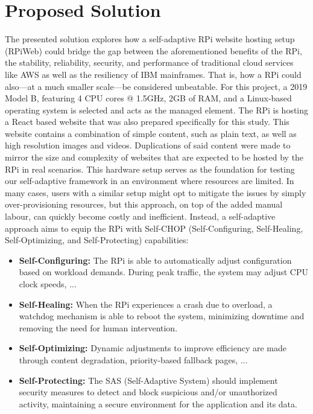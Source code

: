 \documentclass[conference]{IEEEtran}
\begin{document}
\section{\textbf{Proposed Solution}}\label{proposed_solution}
The presented solution explores how a self-adaptive RPi website hosting setup (RPiWeb) could bridge the gap between the aforementioned benefits of the RPi, the stability, reliability, security, and performance of traditional cloud services like AWS as well as the resiliency of IBM mainframes. That is, how a RPi could also—at a much smaller scale—be considered unbeatable. For this project, a 2019 Model B, featuring 4 CPU cores @ 1.5GHz, 2GB of RAM, and a Linux-based operating system is selected and acts as the managed element. The RPi is hosting a React based website that was also prepared specifically for this study. This website contains a combination of simple content, such as plain text, as well as high resolution images and videos. Duplications of said content were made to mirror the size and complexity of websites that are expected to be hosted by the RPi in real scenarios. This hardware setup serves as the foundation for testing our self-adaptive framework in an environment where resources are limited. In many cases, users with a similar setup might opt to mitigate the issues by simply over-provisioning resources, but this approach, on top of the added manual labour, can quickly become costly and inefficient. Instead, a self-adaptive approach aims to equip the RPi with Self-CHOP (Self-Configuring, Self-Healing, Self-Optimizing, and Self-Protecting) capabilities:

\begin{itemize}
    \item \textbf{Self-Configuring:}
          The RPi is able to automatically adjust configuration based on workload demands. During peak traffic, the system may adjust CPU clock speeds, ...
    \item \textbf{Self-Healing:}
          When the RPi experiences a crash due to overload, a watchdog mechanism is able to reboot the system, minimizing downtime and removing the need for human intervention.
    \item \textbf{Self-Optimizing:}
          Dynamic adjustments to improve efficiency are made through content degradation, priority-based fallback pages, ...
    \item \textbf{Self-Protecting:}
          The SAS (Self-Adaptive System) should implement security measures to detect and block suspicious and/or unauthorized activity, maintaining a secure environment for the application and its data.
\end{itemize}
\end{document}
